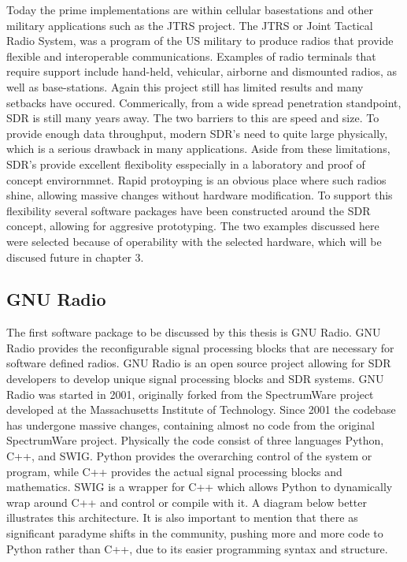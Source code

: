 Today the prime implementations are within cellular basestations and other military applications such as the JTRS project.  The JTRS or  Joint Tactical Radio System, was a program of the US military to produce radios that provide flexible and interoperable communications. Examples of radio terminals that require support include hand-held, vehicular, airborne and dismounted radios, as well as base-stations\cite{24}.  Again this project still has limited results and many setbacks have occured.  Commerically, from a wide spread penetration standpoint, SDR is still many years away.  The two barriers to this are speed and size.  To provide enough data throughput, modern SDR's need to quite large physically, which is a serious drawback in many applications.   Aside from these limitations, SDR's provide excellent flexibolity esspecially in a laboratory and proof of concept envirornmnet.  Rapid protoyping is an obvious place where such radios shine, allowing massive changes without hardware modification.  To support this flexibility several software packages have been constructed around the SDR concept, allowing for aggresive prototyping.  The two examples discussed here were selected because of operability with the selected hardware, which will be discused future in chapter 3.\\

\subsection{GNU Radio}

The first software package to be discussed by this thesis is GNU Radio.  GNU Radio provides the reconfigurable signal processing blocks that are necessary for software defined radios. GNU Radio is an open source project allowing for SDR developers to develop unique signal processing blocks and SDR systems.  GNU Radio was started in 2001, originally forked from the SpectrumWare project developed at the Massachusetts Institute of Technology\cite{spectrumware}.  Since 2001 the codebase has undergone massive changes, containing almost no code from the original SpectrumWare project.  Physically the code consist of three languages Python, C++, and SWIG.  Python provides the overarching control of the system or program, while C++ provides the actual signal processing blocks and mathematics.  SWIG is a wrapper for C++ which allows Python to dynamically wrap around C++ and control or compile with it.  A diagram below better illustrates this architecture.  It is also important to mention that there as significant paradyme shifts in the community, pushing more and more code to Python rather than C++, due to its easier programming syntax and structure.\\

